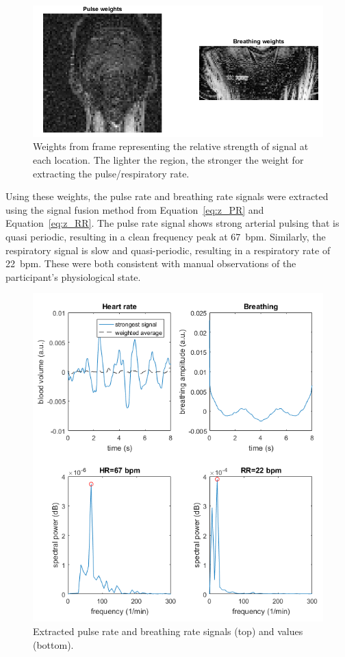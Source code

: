 \documentclass{article}
\begin{document}
\begin{figure}
\centering
\includegraphics[width=\textwidth]{Milestone2_Weights}
\caption{Weights from frame representing the relative strength of signal at each location. The lighter the region, the stronger the weight for extracting the pulse/respiratory rate.}
\label{fig:weights}
\end{figure}

Using these weights, the pulse rate and breathing rate signals were extracted using the signal fusion method from Equation~\ref{eq:z_PR} and Equation~\ref{eq:z_RR}. The pulse rate signal shows strong arterial pulsing that is quasi periodic, resulting in a clean frequency peak at 67~bpm. Similarly, the respiratory signal is slow and quasi-periodic, resulting in a respiratory rate of 22~bpm. These were both consistent with manual observations of the participant's physiological state.

\begin{figure}
\centering
\includegraphics[width=\textwidth]{Milestone2_Signals}
\caption{Extracted pulse rate and breathing rate signals (top) and values (bottom).}
\label{fig:signals}
\end{figure}
\end{document}
